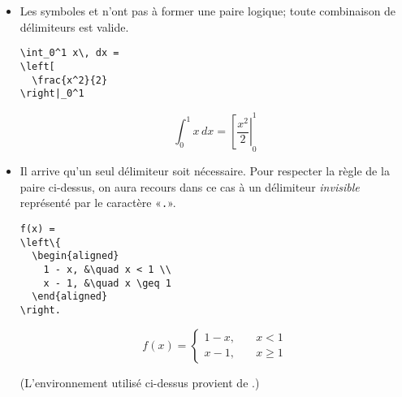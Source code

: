 \begin{itemize}
  Il est possible d'imbriquer des paires de commandes les unes à
  l'intérieur des autres, pour autant que l'expression compte toujours
  autant de \cmdprint{\left} que de \cmdprint{\right}.
  \begin{demo}
    \begin{texample}
\begin{lstlisting}
\left[
  \int
  \left(
    1 + \frac{x}{k}
  \right) dx
\right]
\end{lstlisting}
      \producing
      \begin{equation*}
        \left[
          \int
          \left(
            1 + \frac{x}{k}
          \right) dx
        \right]
      \end{equation*}
    \end{texample}
  \end{demo}
\item Les symboles  et  n'ont pas à
  former une paire logique; toute combinaison de délimiteurs est valide.
  \begin{demo}
    \begin{texample}
\begin{lstlisting}
\int_0^1 x\, dx =
\left[
  \frac{x^2}{2}
\right|_0^1
\end{lstlisting}
      \producing
      \begin{equation*}
        \int_0^1 x\, dx =
        \left[
          \frac{x^2}{2}
        \right|_0^1
      \end{equation*}
    \end{texample}
  \end{demo}
\item Il arrive qu'un seul délimiteur soit nécessaire. Pour respecter
  la règle de la paire ci-dessus, on aura recours dans ce cas à un
  délimiteur \emph{invisible} représenté par le caractère «\verb=.=».
  \begin{demo}
    \begin{texample}
\begin{lstlisting}
f(x) =
\left\{
  \begin{aligned}
    1 - x, &\quad x < 1 \\
    x - 1, &\quad x \geq 1
  \end{aligned}
\right.
\end{lstlisting}
      \producing
      \begin{equation*}
        f(x) =
        \left\{
          \begin{aligned}
            1 - x, &\quad x < 1 \\
            x - 1, &\quad x \geq 1
          \end{aligned}
        \right.
      \end{equation*}
    \end{texample}
  \end{demo}
  (L'environnement  utilisé ci-dessus provient de
  .)


\end{itemize}
